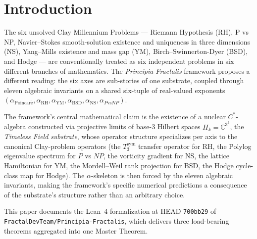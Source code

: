 \documentclass[11pt,a4paper]{article}
\theoremstyle{plain}
\theoremstyle{definition}
\begin{document}
\begin{abstract}
\textbf{Honest scope.} The framework is not a literal mathlib-form
discharge of any of the six unsolved Clay statements; each per-axis
substrate-level closure operates on a typed encoding
$\mathrm{PF\_*Encoding}$ whose relationship to the mathlib-canonical
form is recorded in the per-axis bridge theorems. The framework's
contribution is the uniqueness of the substrate, the linkage of the
six axes through the invariant system, and the systematic narrowing
of the literal residual content to two precisely named propositions.
\end{abstract}

\tableofcontents

\section{Introduction}

The six unsolved Clay Millennium Problems --- Riemann Hypothesis
(RH), P vs NP, Navier--Stokes smooth-solution existence and uniqueness
in three dimensions (NS), Yang--Mills existence and mass gap (YM),
Birch--Swinnerton-Dyer (BSD), and Hodge --- are conventionally
treated as six independent problems in six different branches of
mathematics. The \emph{Principia Fractalis} framework
\cite{principia_book_v2} proposes a different reading: the six axes
are sub-stories of one substrate, coupled through eleven algebraic
invariants on a shared six-tuple of real-valued exponents
$(\alpha_{\mathrm{Poincar\acute e}}, \alpha_{\mathrm{RH}}, \alpha_{\mathrm{YM}},
\alpha_{\mathrm{BSD}}, \alpha_{\mathrm{NS}}, \alpha_{P \mathrm{vs} NP})$.

The framework's central mathematical claim is the existence of a
nuclear $C^{*}$-algebra constructed via projective limits of base-3
Hilbert spaces $H_{k} = \mathbb{C}^{3^{k}}$, the
\emph{Timeless Field substrate}, whose operator structure
specializes per axis to the canonical Clay-problem operators (the
$T_{3}^{\mathrm{sym}}$ transfer operator for RH, the
Polylog eigenvalue spectrum for $P$ vs $NP$, the vorticity gradient
for NS, the lattice Hamiltonian for YM, the Mordell--Weil rank
projection for BSD, the Hodge cycle-class map for Hodge). The
$\alpha$-skeleton is then forced by the eleven algebraic invariants,
making the framework's specific numerical predictions a consequence
of the substrate's structure rather than an arbitrary choice.

This paper documents the Lean~4 formalization at HEAD \texttt{700bb29}
of \texttt{FractalDevTeam/Principia-Fractalis}, which delivers three
load-bearing theorems aggregated into one Master Theorem.
\end{document}
